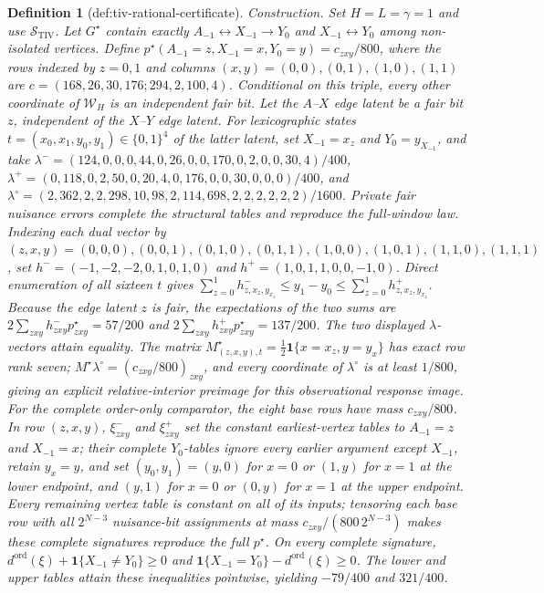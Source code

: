\documentclass{article}
\newtheorem{definition}{Definition}
\begin{document}
\begin{definition}[def:tiv-rational-certificate]
\par\smallskip\noindent\emph{Construction.} Set \(H=L=\gamma=1\) and use \(\mathcal S_{\mathrm{TIV}}\). Let \(G^{\star}\) contain exactly \(A_{-1}\leftrightarrow X_{-1}\to Y_0\) and \(X_{-1}\leftrightarrow Y_0\) among non-isolated vertices. Define \(p^{\star}(A_{-1}=z,X_{-1}=x,Y_0=y)=c_{zxy}/800\), where the rows indexed by \(z=0,1\) and columns \((x,y)=(0,0),(0,1),(1,0),(1,1)\) are \(c=(168,26,30,176;294,2,100,4)\). Conditional on this triple, every other coordinate of \(\mathcal W_H\) is an independent fair bit. Let the \(A\)--\(X\) edge latent be a fair bit \(z\), independent of the \(X\)--\(Y\) edge latent. For lexicographic states \(t=(x_0,x_1,y_0,y_1)\in\{0,1\}^{4}\) of the latter latent, set \(X_{-1}=x_z\) and \(Y_0=y_{X_{-1}}\), and take \(\lambda^{-}=(124,0,0,0,44,0,26,0,0,170,0,2,0,0,30,4)/400\), \(\lambda^{+}=(0,118,0,2,50,0,20,4,0,176,0,0,30,0,0,0)/400\), and \(\lambda^{\circ}=(2,362,2,2,298,10,98,2,114,698,2,2,2,2,2,2)/1600\). Private fair nuisance errors complete the structural tables and reproduce the full-window law. Indexing each dual vector by \((z,x,y)=(0,0,0),(0,0,1),(0,1,0),(0,1,1),(1,0,0),(1,0,1),(1,1,0),(1,1,1)\), set \(h^{-}=(-1,-2,-2,0,1,0,1,0)\) and \(h^{+}=(1,0,1,1,0,0,-1,0)\). Direct enumeration of all sixteen \(t\) gives \(\sum_{z=0}^{1}h^{-}_{z,x_z,y_{x_z}}\le y_1-y_0\le\sum_{z=0}^{1}h^{+}_{z,x_z,y_{x_z}}\). Because the edge latent \(z\) is fair, the expectations of the two sums are \(2\sum_{zxy}h^{-}_{zxy}p^{\star}_{zxy}=57/200\) and \(2\sum_{zxy}h^{+}_{zxy}p^{\star}_{zxy}=137/200\). The two displayed \(\lambda\)-vectors attain equality. The matrix \(M^{\star}_{(z,x,y),t}=\tfrac12\mathbf 1\{x=x_z,y=y_x\}\) has exact row rank seven; \(M^{\star}\lambda^{\circ}=(c_{zxy}/800)_{zxy}\), and every coordinate of \(\lambda^{\circ}\) is at least \(1/800\), giving an explicit relative-interior preimage for this observational response image. For the complete order-only comparator, the eight base rows have mass \(c_{zxy}/800\). In row \((z,x,y)\), \(\xi_{zxy}^{-}\) and \(\xi_{zxy}^{+}\) set the constant earliest-vertex tables to \(A_{-1}=z\) and \(X_{-1}=x\); their complete \(Y_0\)-tables ignore every earlier argument except \(X_{-1}\), retain \(y_x=y\), and set \((y_0,y_1)=(y,0)\) for \(x=0\) or \((1,y)\) for \(x=1\) at the lower endpoint, and \((y,1)\) for \(x=0\) or \((0,y)\) for \(x=1\) at the upper endpoint. Every remaining vertex table is constant on all of its inputs; tensoring each base row with all \(2^{N-3}\) nuisance-bit assignments at mass \(c_{zxy}/(800\,2^{N-3})\) makes these complete signatures reproduce the full \(p^{\star}\). On every complete signature, \(d^{\mathrm{ord}}(\xi)+\mathbf 1\{X_{-1}\ne Y_0\}\ge0\) and \(\mathbf 1\{X_{-1}=Y_0\}-d^{\mathrm{ord}}(\xi)\ge0\). The lower and upper tables attain these inequalities pointwise, yielding \(-79/400\) and \(321/400\).

\end{definition}
\end{document}
